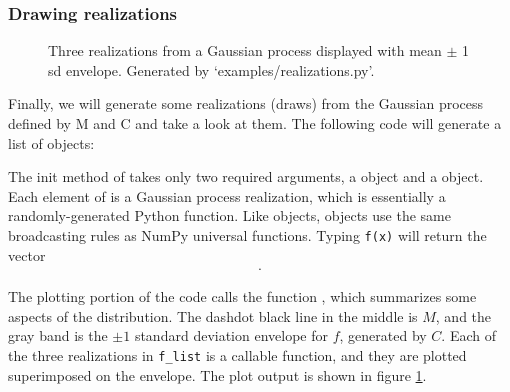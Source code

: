 \subsubsection{Drawing realizations}\label{subsub:realizations}
\begin{figure}
    \centering
    \caption{Three realizations from a Gaussian process displayed with mean $\pm$ 1 sd envelope. Generated by {\sffamily `examples/realizations.py'}.}
    \label{fig:realizations}
\end{figure}

Finally, we will generate some realizations (draws) from the Gaussian process defined by M and C and take a look at them. The following code will generate a list of  objects:


    The init method of  takes only two required arguments, a  object and a  object. Each element of  is a Gaussian process realization, which is essentially a randomly-generated Python function. Like  objects,  objects use the same broadcasting rules as NumPy universal functions. Typing \texttt{f(x)} will return the vector
\begin{eqnarray*}
    [\texttt{f(x[0])}\ldots \texttt{f(x[N-1])}].
\end{eqnarray*}


The plotting portion of the code calls the function , which summarizes some aspects of the distribution. The dashdot black line in the middle is $M$, and the gray band is the $\pm 1$ standard deviation envelope for $f$, generated by $C$. Each of the three realizations in \texttt{f_list} is a callable function, and they are plotted superimposed on the envelope. The plot output is shown in figure \ref{fig:realizations}.


